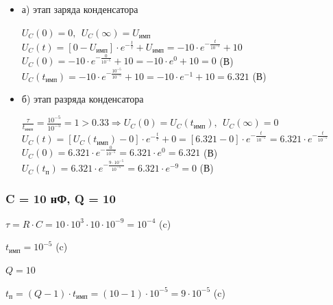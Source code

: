 \begin{itemize}
\item[] а) этап заряда конденсатора

		$U_C(0) = 0,\ \ U_C(\infty) = U_\text{имп}$\\
		$U_C(t) = [0 - U_\text{имп}] \cdot e^{-\frac{t}{\tau}} + U_\text{имп} = -10 \cdot e^{-\frac{t}{10^{-5}}} + 10$\\
		$U_C(0) = -10 \cdot e^{-\frac{0}{10^{-5}}} + 10 = -10 \cdot e^0 + 10 = 0$ (В)\\
		$U_C(t_\text{имп}) = -10 \cdot e^{-\frac{10^{-5}}{10^{-5}}} + 10 = -10 \cdot e^{-1} + 10 = 6.321$ (В)\\

\item[] б) этап разряда конденсатора

		$\frac{\tau}{t_\text{имп}} = \frac{10^{-5}}{10^{-5}} = 1 > 0.33 \Rightarrow U_C(0) = U_C(t_\text{имп}),\ \ U_C(\infty) = 0$\\
		$U_C(t) = [U_C(t_\text{имп}) - 0] \cdot e^{-\frac{t}{\tau}} + 0 =  [6.321 - 0] \cdot e^{-\frac{t}{10^{-5}}} = 6.321 \cdot e^{-\frac{t}{10^{-5}}}$\\
		$U_C(0) = 6.321 \cdot e^{-\frac{0}{10^{-5}}} = 6.321 \cdot e^0 = 6.321$ (В)\\
		$U_C(t_\text{п}) = 6.321 \cdot e^{-\frac{9 \cdot 10^{-5}}{10^{-5}}} = 6.321 \cdot e^{-9} = 0$ (В)\\
		
\end{itemize}

\subsubsection{C = 10 нФ, Q = 10}

		$\tau = R \cdot C = 10 \cdot 10^3 \cdot 10 \cdot 10^{-9} = 10^{-4}$ (c)
		
		$t_\text{имп} = 10^{-5}$ (c)
		
		$Q = 10$		
		
		$t_\text{п} = (Q - 1) \cdot t_\text{имп} = (10 - 1) \cdot 10^{-5} = 9 \cdot 10^{-5}$ (c)

